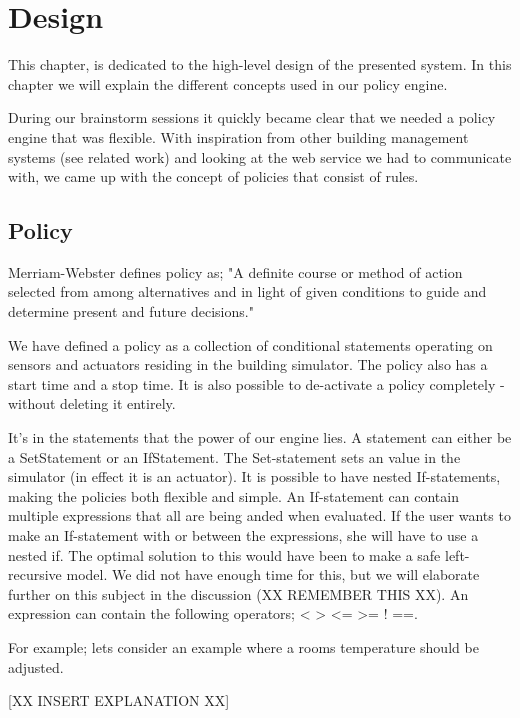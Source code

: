 \section{Design}
This chapter, is dedicated to the high-level design of the presented system. In this chapter we will explain the different concepts used in our policy engine. 

During our brainstorm sessions it quickly became clear that we needed a policy engine that was flexible. With inspiration from other building management systems (see related work) and looking at the web service we had to communicate with, we came up with the concept of policies that consist of rules.

\subsection{Policy}
Merriam-Webster defines policy as; "A definite course or method of action selected from among alternatives and in light of given conditions to guide and determine present and future decisions."

We have defined a policy as a collection of conditional statements operating on sensors and actuators residing in the building simulator. The policy also has a start time and a stop time. It is also possible to de-activate a policy completely - without deleting it entirely.

It's in the statements that the power of our engine lies. A statement can either be a SetStatement or an IfStatement. The Set-statement sets an value in the simulator (in effect it is an actuator). It is possible to have nested If-statements, making the policies both flexible and simple. An If-statement can contain multiple expressions that all are being anded when evaluated. If the user wants to make an If-statement with or between the expressions, she will have to use a nested if. The optimal solution to this would have been to make a safe left-recursive model. We did not have enough time for this, but we will elaborate further on this subject in the discussion (XX REMEMBER THIS XX). An expression can contain the following operators; < > <= >= ! ==. 

For example; lets consider an example where a rooms temperature should be adjusted.

[XX INSERT EXPLANATION XX]

